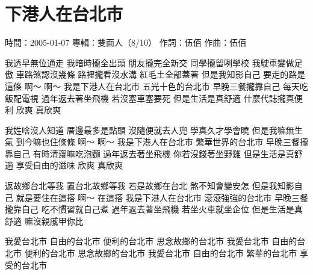\documentclass[UTF8,a4paper,oneside,twocolumn,12pt]{ctexbook}
\newcommand{\infopair}[2]{\textbullet #1：#2}
\newcommand{\zc}[1][伍佰]{\infopair{作詞}{#1}}
\newcommand{\zq}[1][伍佰]{\infopair{作曲}{#1}}
\newcommand{\zj}[1]{\infopair{專輯}{#1}}
\newcommand{\sj}[1]{\infopair{時間}{#1}}
\newenvironment{info}{\begin{flushleft}\kaishu
	}
	{\end{flushleft}\normalsize\yahei\par}
\newenvironment{lyric}{
	}
{}
\begin{document}
\section{下港人在台北市}
\begin{info}
	\sj{2005-01-07}
	\zj{雙面人（8/10）}
	\zc
	\zq
\end{info}
\begin{lyric}
	我透早無位通走 我暗時攏全出頭
	朋友攏完全新交 同學攏留咧學校
	我駛車變做足傲 車路煞認沒幾條
	路裡攏看沒水溝 紅毛土全部蓋著
	但是我知影自己 要走的路是這條 啊～ 啊～
	我是下港人在台北市 五光十色的台北市
	早晚三餐攏靠自己 每天吃飯配電視
	過年返去著坐飛機 若沒塞車塞要死
	但是生活是真舒適 什麼代誌攏真便利
	欣爽 真欣爽

	我姓啥沒人知道 厝邊最多是點頭
	沒隨便就去人兜 學真久才學會曉
	但是我嘛無生氣 到今嘛也住條條 啊～ 啊～
	我是下港人在台北市 繁華世界的台北市
	早晚三餐攏靠自己 有時清齋嘛吃泡麵
	過年返去著坐飛機 你若沒錢著坐野雞
	但是生活是真舒適 享受自由的滋味
	欣爽 真欣爽

	返故鄉台北等我 置台北故鄉等我
	若是故鄉在台北 煞不知會變安怎
	但是我知影自己 就是要住在這搭 啊～ 在這搭
	我是下港人在台北市 滾滾強強的台北市
	早晚三餐攏靠自己 吃不慣習就自己煮
	過年返去著坐飛機 若坐火車就坐企位
	但是生活是真舒適 嘛沒親戚甲你比

	我愛台北市 自由的台北市
	便利的台北市 思念故鄉的台北市
	我愛台北市 自由的台北市
	便利的台北市 思念故鄉的台北市
	我愛台北市 自由的台北市
	繁華的台北市 享受的台北市
\end{lyric}
\end{document}
